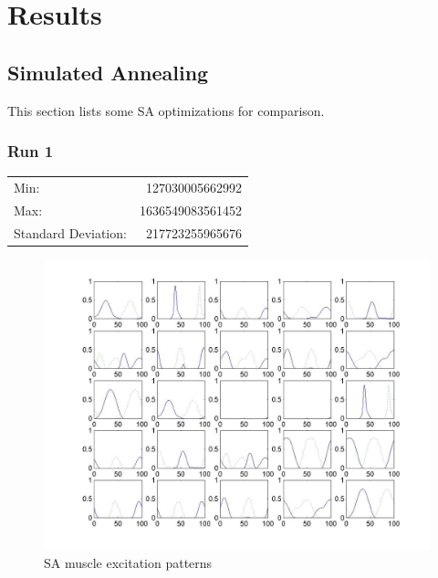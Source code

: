 \section{Results}

\subsection{Simulated Annealing}
This section lists some SA optimizations for comparison.

\subsubsection{Run 1} 
\label{sec:run_1}

\begin{tabular}{lr}
	Min: 			& 127030005662992 \\
	Max:			& 1636549083561452 \\
	Standard Deviation:	& 217723255965676\\
\end{tabular}

\begin{figure}[!h]
	\begin{center}
		\includegraphics[width=120mm]{images/saXX_exc}
               	\caption{SA muscle excitation patterns}
                \label{saXX_exc}
        \end{center}
\end{figure}

